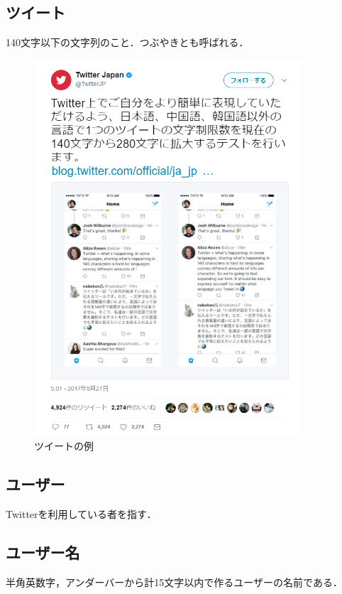 \subsection{ツイート}
140文字以下の文字列のこと．つぶやきとも呼ばれる．
\begin{figure}[htb]
\centering
\includegraphics[width=10cm]{02.png}
\caption{ツイートの例}\label{2}
\end{figure}
\clearpage

\subsection{ユーザー}
Twitterを利用している者を指す．
　
\subsection{ユーザー名}
半角英数字，アンダーバーから計15文字以内で作るユーザーの名前である．

